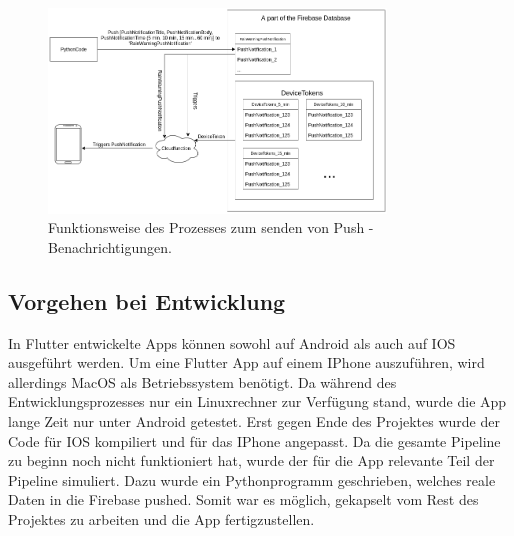 \begin{figure}[H]
 \centering
 \includegraphics[width=0.8\textwidth,angle=0]{abb/funktionsweise_pushnachrichten_senden}
 \caption[Funktionsweise von Pushbenachrichtigungen]{Funktionsweise des Prozesses zum senden von Push - Benachrichtigungen.}
\label{fig:funktionsweise_pushnachrichten_senden}
\end{figure}

\subsection{Vorgehen bei Entwicklung}
In Flutter entwickelte Apps können sowohl auf Android als auch auf IOS ausgeführt werden. 
Um eine Flutter App auf einem IPhone auszuführen, wird allerdings MacOS als Betriebssystem benötigt. 
Da während des Entwicklungsprozesses nur ein Linuxrechner zur Verfügung stand, wurde die App lange Zeit nur unter
Android getestet. 
Erst gegen Ende des Projektes wurde der Code für IOS kompiliert und für das IPhone angepasst.  
Da die gesamte Pipeline zu beginn noch nicht funktioniert hat, wurde der für die App relevante Teil der Pipeline simuliert.
Dazu wurde ein Pythonprogramm geschrieben, welches reale Daten in die Firebase pushed. 
Somit war es möglich, gekapselt vom Rest des Projektes zu arbeiten und die App fertigzustellen.


    


